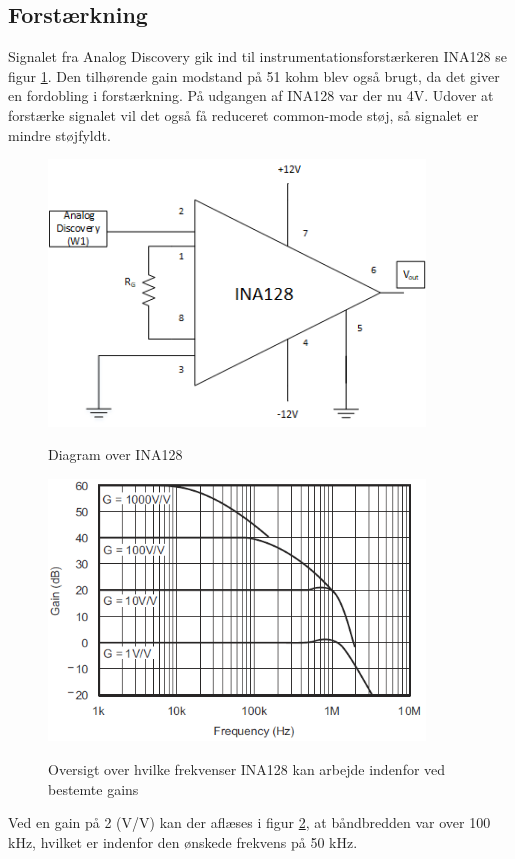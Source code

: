 \subsection{Forstærkning}
Signalet fra Analog Discovery gik ind til instrumentationsforstærkeren INA128 se figur \ref{fig:ina128}. Den tilhørende gain modstand på 51 kohm blev også brugt, da det giver en fordobling i forstærkning. På udgangen af INA128 var der nu 4V. Udover at forstærke signalet vil det også få reduceret common-mode støj, så signalet er mindre støjfyldt.

\begin{figure}[H]
\centering
{\includegraphics[width=10cm]
{Figure/ina128}}
\caption{Diagram over INA128}
\label{fig:ina128}
\end{figure}


\begin{figure}[H]
\centering
{\includegraphics[width=10cm]
{Figure/ina128gain}}
\caption{Oversigt over hvilke frekvenser INA128 kan arbejde indenfor ved bestemte gains}
\label{fig:ina128gain}
\end{figure}

Ved en gain på 2 (V/V) kan der aflæses i figur \ref{fig:ina128gain}, at båndbredden var over 100 kHz, hvilket er indenfor den ønskede frekvens på 50 kHz. 

